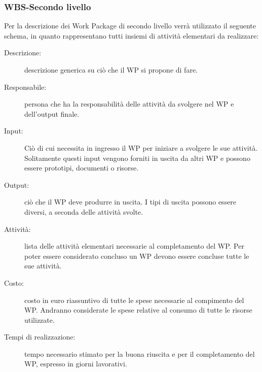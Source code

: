 \subsubsection {WBS-Secondo livello}
Per la descrizione dei Work Package di secondo livello verr\`{a} utilizzato il seguente schema, in quanto rappresentano tutti insiemi di attivit\`{a} elementari da realizzare:
\begin{description}
\item[Descrizione:] descrizione generica su ci\`{o} che il WP si propone di fare.
\item[Responsabile:] persona che ha la responsabilit\`{a} delle attivit\`{a} da svolgere nel WP e dell'output finale.
\item[Input:] Ci\`{o} di cui necessita in ingresso il WP per iniziare a svolgere le sue attivit\`{a}. Solitamente questi input vengono forniti in uscita da altri WP e possono essere prototipi, documenti o risorse.
\item[Output:] ci\`{o} che il WP deve produrre in uscita. I tipi di uscita possono essere diversi, a seconda delle attivit\`{a} svolte.
\item[Attivit\`{a}:] lista delle attivit\`{a} elementari necessarie al completamento del WP. Per poter essere considerato concluso un WP devono essere concluse tutte le sue attivit\`{a}.
\item[Costo:] costo in euro riassuntivo di tutte le spese necessarie al compimento del WP. Andranno considerate le spese relative al consumo di tutte le risorse utilizzate.
\item[Tempi di realizzazione:] tempo necessario stimato per la buona riuscita e per il completamento del WP, espresso in giorni lavorativi.
\end{description}

